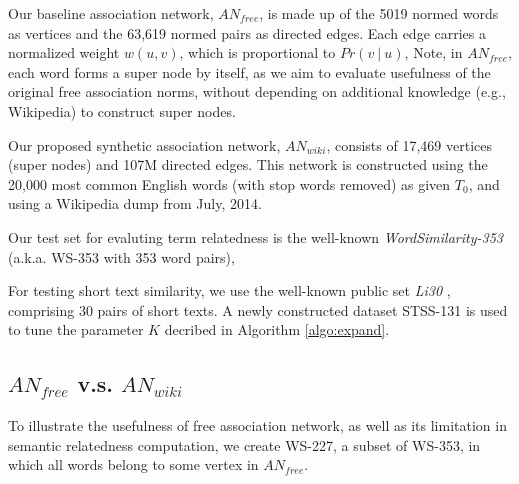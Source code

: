 Our baseline association network, $AN_{free}$, is made up of the 5019
normed words as vertices and the 63,619 normed pairs as directed edges.
Each edge carries a normalized weight $w(u, v)$, which is
proportional to $Pr(v ~|~ u)$,
Note, in $AN_{free}$, each word forms a super node by itself, as we aim to
evaluate usefulness of the original free association norms, without
depending on additional knowledge (e.g., Wikipedia) to construct super nodes.

Our proposed synthetic association network, $AN_{wiki}$, consists of 17,469
vertices (super nodes) and 107M directed edges.
This network is constructed using the 20,000 most
common English words (with stop words removed) as given $T_0$, and using
a Wikipedia dump from July, 2014.

Our test set for evaluting term relatedness is the well-known
{\em WordSimilarity-353} \cite{WS353} (a.k.a. WS-353 with 353 word pairs), 
%

For testing short text similarity, we use the well-known public set
{\em Li30} \cite{li06}, comprising 30 pairs of short texts. A newly constructed dataset
STSS-131 \cite{STSS131} is used to tune the parameter $K$ decribed in
Algorithm \ref{algo:expand}.


\subsection{$AN_{free}$ v.s. $AN_{wiki}$}
\label{sec:free}
To illustrate the usefulness of free association network, as well as
its limitation in semantic relatedness computation, we create WS-227,
a subset of WS-353, in which all words belong to some vertex in
$AN_{free}$.

